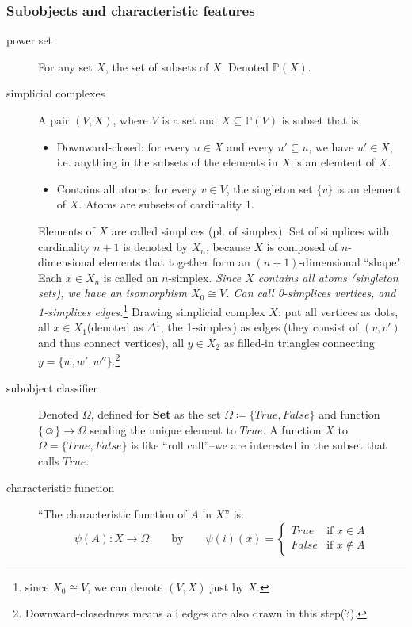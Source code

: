 \documentclass{article}
\begin{document}
\subsubsection{Subobjects and characteristic features}
\begin{description}
\item[power set]For any set $X$, the set of subsets of $X$. Denoted $\mathbb{P}(X)$.
\item[simplicial complexes]A pair $(V,X)$, where $V$ is a set and $X \subseteq \mathbb{P}(V)$ is subset that is:
\begin{itemize}
\item Downward-closed: for every $u \in X$ and every $u'\subseteq u$, we have $u' \in X$, i.e. anything in the subsets of the elements in $X$ is an elemtent of $X$.
\item Contains all atoms: for every $v \in V$, the singleton set $\{v\}$ is an element of $X$. Atoms are subsets of cardinality 1.
\end{itemize}
Elements of $X$ are called simplices (pl. of simplex).
Set of simplices with cardinality $n + 1$ is denoted by $X_n$, because $X$ is composed of $n$-dimensional elements that together form an $(n+1)$-dimensional ``shape". Each $x \in X_n$ is called an $n$-simplex.
\emph{Since $X$ contains all atoms (singleton sets), we have an isomorphism $X_0 \cong V$. Can call 0-simplices \emph{vertices}, and 1-simplices \emph{edges}.}\footnote{since $X_0 \cong V$, we can denote $(V,X)$ just by $X$.}
Drawing simplicial complex $X$: put all vertices as dots, all $x \in X_1$(denoted as $\Delta^1$, the 1-simplex) as edges (they consist of $(v, v')$ and thus connect vertices), all $y \in X_2$ as filled-in triangles connecting $y = \{w,w',w''\}$.\footnote{Downward-closedness means all edges are also drawn in this step(?).}
\item[subobject classifier] Denoted $\Omega$, defined for \textbf{Set} as the set $\Omega \coloneqq \{True, False\}$ and function $\{\smiley\} \rightarrow \Omega$ sending the unique element to $True$.
A function $X$ to $\Omega = \{True, False\}$ is like ``roll call''--we are interested in the subset that calls $True$.
\item[characteristic function] ``The characteristic function of $A$ in $X$'' is:
\begin{equation*}
\psi (A): X \rightarrow \Omega \qquad \text{by} \qquad \psi (i)(x)=
\begin{cases}
True & \text{if } x \in A \\
False & \text{if } x \notin A
\end{cases}
\end{equation*}
\end{description}
\end{document}
